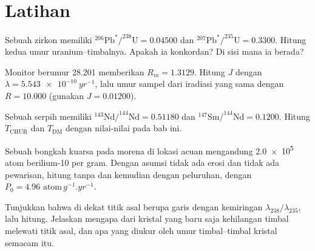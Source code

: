 \section{Latihan}

\begin{exercise}[$\star$]\label{exo:b3:advanced-geochronology:1}
Sebuah zirkon memiliki $^{206}\mathrm{Pb}^*/^{238}\mathrm{U} = 0.04500$ dan
$^{207}\mathrm{Pb}^*/^{235}\mathrm{U} = 0.3300$. Hitung kedua
umur uranium--timbalnya. Apakah ia konkordan? Di sisi  mana ia
berada?
\end{exercise}

\begin{exercise}[$\star$]\label{exo:b3:advanced-geochronology:2}
Monitor berumur \qty{28.201}{\Ma} memberikan $R_m = 1.3129$. Hitung $J$ dengan $\lambda
= \qty{5.543e-10}{yr^{-1}}$, lalu umur sampel dari iradiasi yang sama
dengan $R = 10.000$ (gunakan $J = 0.01200$).
\end{exercise}

\begin{exercise}[$\star$]\label{exo:b3:advanced-geochronology:3}
Sebuah serpih memiliki $^{143}\mathrm{Nd}/^{144}\mathrm{Nd} = 0.51180$ dan
$^{147}\mathrm{Sm}/^{144}\mathrm{Nd} = 0.1200$. Hitung $T_{\mathrm{CHUR}}$
dan $T_{\mathrm{DM}}$ dengan nilai-nilai pada bab ini.
\end{exercise}

\begin{exercise}[$\star$]\label{exo:b3:advanced-geochronology:4}
Sebuah bongkah kuarsa pada morena di lokasi acuan mengandung \num{2.0e5}
atom berilium-10 per gram. Dengan asumsi tidak ada erosi dan tidak ada pewarisan,
hitung  tanpa dan kemudian dengan peluruhan, dengan $P_0 =
\num{4.96}\text{ atom}\,\unit{g^{-1}.yr^{-1}}$.
\end{exercise}

\begin{exercise}[$\star\star$]\label{exo:b3:advanced-geochronology:5}
Tunjukkan bahwa di dekat titik asal  berupa garis dengan kemiringan
$\lambda_{238}/\lambda_{235}$, lalu hitung. Jelaskan mengapa  dari
kristal yang baru saja kehilangan timbal melewati titik asal, dan
apa yang diukur oleh umur timbal--timbal kristal semacam itu.
\end{exercise}

